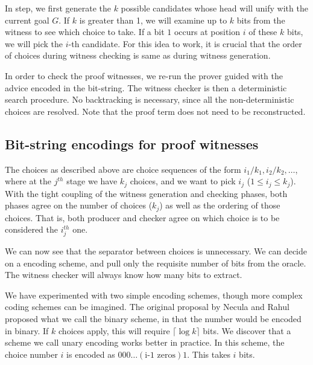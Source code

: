 \documentclass{llncs}
\begin{document}
In {} step, we first generate the $k$ possible candidates
whose head will unify with the current goal $G$. If $k$ is greater
than 1, we will examine up to $k$ bits from the witness to see which
choice to take. If a bit $1$ occurs at position $i$ of these $k$ bits,
we will pick the $i$-th candidate. For this idea to work, it is
crucial that the order of choices during witness checking is same as
during witness generation.

In order to check the proof witnesses, we re-run the prover guided
with the advice encoded in the bit-string. The witness checker is then
a deterministic search procedure. No backtracking is necessary, since
all the non-deterministic choices are resolved.
Note that the proof term does not need to be reconstructed. 

\subsection{Bit-string encodings for proof witnesses}

The choices as described above are choice sequences of the form
$i_1/k_1,i_2/k_2,\ldots$, where at the $j^{th}$ stage we have $k_j$
choices, and we want to pick $i_j$ ($1 \leq i_j \leq k_j$). With the
tight coupling of the witness generation and checking phases, both
phases agree on the number of choices ($k_j$) as well as the ordering
of those choices. That is, both producer and checker agree on which
choice is to be considered the $i_j^{th}$ one.

We can now see that the separator between choices is unnecessary. We
can decide on a encoding scheme, and pull only the requisite number of
bits from the oracle. The witness checker will always know how many
bits to extract.

We have experimented with two simple encoding schemes, though more
complex coding schemes can be imagined. The original proposal by
Necula and Rahul proposed what we call the binary scheme, in that the
number would be encoded in binary. If $k$ choices apply, this will
require $\lceil\log k\rceil$ bits. We discover that a scheme we call
unary encoding works better in practice. In this scheme, the choice
number $i$ is encoded as $0 0 0 \ldots (\mbox{i-1 zeros}) 1$. This
takes $i$ bits.
\end{document}
